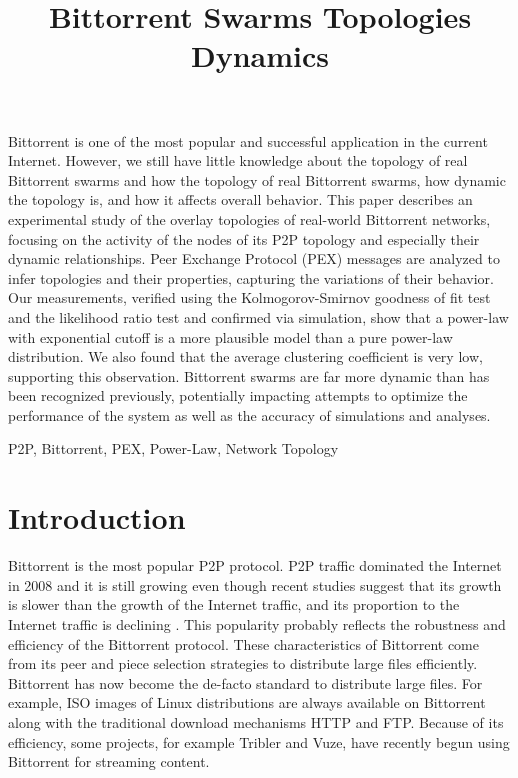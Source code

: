 \documentclass[paper]{ieice}
\title{Bittorrent Swarms Topologies Dynamics}
\begin{document}
\maketitle

\begin{summary}
Bittorrent is one of the most popular and successful application in the current Internet.
However, we still have little knowledge about the topology of real Bittorrent swarms and how the topology of real Bittorrent swarms, how dynamic the topology is, and how it affects overall behavior.
This paper describes an experimental study of the overlay topologies of real-world Bittorrent networks, focusing on the activity of the nodes of its P2P topology and especially their dynamic relationships. 
Peer Exchange Protocol (PEX) messages are analyzed to infer topologies and their properties, capturing the variations of their behavior.  
Our measurements, verified using the Kolmogorov-Smirnov goodness of fit test and the likelihood ratio test and confirmed via simulation, show that a power-law with exponential cutoff is a more plausible model than a pure power-law distribution.  
We also found that the average clustering coefficient is very low, supporting this observation.  
Bittorrent swarms are far more dynamic than has been recognized previously, potentially impacting attempts to optimize the performance of the system as well as the accuracy of simulations and analyses.
\end{summary}
\begin{keywords}
P2P, Bittorrent, PEX, Power-Law, Network Topology 
\end{keywords}


\section{Introduction}
Bittorrent is the most popular P2P protocol.
P2P traffic dominated the Internet in 2008 and it is still growing even though recent studies suggest that its growth is slower than the growth of the Internet traffic, and its proportion to the Internet traffic is declining \cite{labovitz2010internet} \cite{index2010forecast}.
This popularity probably reflects the robustness and efficiency of the Bittorrent protocol. 
These characteristics of Bittorrent come from its peer and piece selection strategies to distribute large files efficiently. 
Bittorrent has now become the de-facto standard to distribute large files. 
For example, ISO images of Linux distributions are always available on Bittorrent along with the traditional download mechanisms HTTP and FTP.  
Because of its efficiency, some projects, for example Tribler and Vuze, have recently begun using Bittorrent for streaming content.
\end{document}
